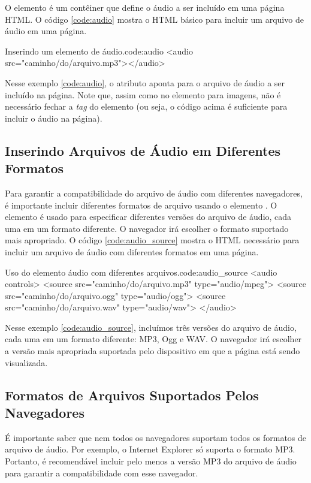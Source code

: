 O elemento  é um contêiner que define o áudio a ser incluído em uma página HTML. O código \ref{code:audio} mostra o HTML básico para incluir um arquivo de áudio em uma página.

\begin{htmlcode}{Inserindo um elemento de áudio.}{code:audio}
<audio src="caminho/do/arquivo.mp3"></audio>
\end{htmlcode}

Nesse exemplo \ref{code:audio}, o atributo  aponta para o arquivo de áudio a ser incluído na página. Note que, assim como no elemento  para imagens, não é necessário fechar a \textit{tag} do elemento  (ou seja, o código acima é suficiente para incluir o áudio na página).

\subsection{Inserindo Arquivos de Áudio em Diferentes Formatos}

Para garantir a compatibilidade do arquivo de áudio com diferentes navegadores, é importante incluir diferentes formatos de arquivo usando o elemento . O elemento  é usado para especificar diferentes versões do arquivo de áudio, cada uma em um formato diferente. O navegador irá escolher o formato suportado mais apropriado. O código \ref{code:audio_source} mostra o HTML necessário para incluir um arquivo de áudio com diferentes formatos em uma página.

\begin{htmlcode}{Uso do elemento áudio com diferentes arquivos.}{code:audio_source}
<audio controls>
  <source src="caminho/do/arquivo.mp3" type="audio/mpeg">
  <source src="caminho/do/arquivo.ogg" type="audio/ogg">
  <source src="caminho/do/arquivo.wav" type="audio/wav">
</audio>
\end{htmlcode}

Nesse exemplo \ref{code:audio_source}, incluímos três versões do arquivo de áudio, cada uma em um formato diferente: MP3, Ogg e WAV. O navegador irá escolher a versão mais apropriada suportada pelo dispositivo em que a página está sendo visualizada.

\subsection{Formatos de Arquivos Suportados Pelos Navegadores}

É importante saber que nem todos os navegadores suportam todos os formatos de arquivo de áudio. Por exemplo, o Internet Explorer só suporta o formato MP3. Portanto, é recomendável incluir pelo menos a versão MP3 do arquivo de áudio para garantir a compatibilidade com esse navegador.

